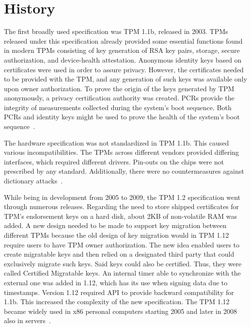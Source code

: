 \section{History}
The first broadly used specification was TPM 1.1b, released in 2003. TPMs released under this specification already provided some essential functions found in modern TPMs consisting of key generation of RSA key pairs, storage, secure authorization, and device-health attestation. Anonymous identity keys based on certificates were used in order to assure privacy. However, the certificates needed to be provided with the TPM, and any generation of such keys was available only upon owner authorization. To prove the origin of the keys generated by TPM anonymously, a privacy certification authority was created. PCRs provide the integrity of measurements collected during the system's boot sequence. Both PCRs and identity keys might be used to prove the health of the system's boot sequence~\cite[p.~2]{arthur2015practical}.

The hardware specification was not standardized in TPM 1.1b. This caused various incompatibilities. The TPMs across different vendors provided differing interfaces, which required different drivers. Pin-outs on the chips were not prescribed by any standard. Additionally, there were no countermeasures against dictionary attacks~\cite[p.~2]{arthur2015practical}.

While being in development from 2005 to 2009, the TPM 1.2 specification went through numerous releases. Regarding the need to store shipped certificates for TPM's endorsement keys on a hard disk, about 2KB of non-volatile RAM was added. A new design needed to be made to support key migration between different TPMs because the old design of key migration would in TPM 1.12 require users to have TPM owner authorization. The new idea enabled users to create migratable keys and then relied on a designated third party that could exclusively migrate such keys. Said keys could also be certified. Thus, they were called Certified Migratable keys. An internal timer able to synchronize with the external one was added in 1.12, which has its use when signing data due to timestamps. Version 1.12 required API to provide backward compatibility for 1.1b. This increased the complexity of the new specification. The TPM 1.12 became widely used in x86 personal computers starting 2005 and later in 2008 also in servers~\cite[p.~3]{arthur2015practical}.


